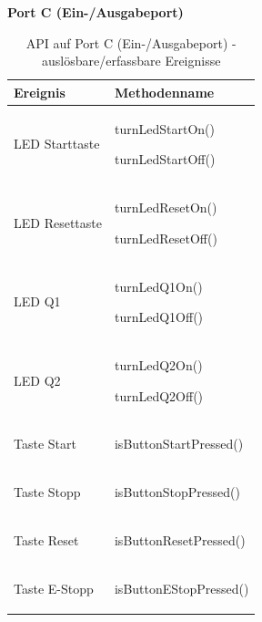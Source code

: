 \documentclass[a4paper, 11pt]{article}
\begin{document}
\newpage

\noindent\textbf{Port C (Ein-/Ausgabeport)}
\begin{table}[h]
\center
\begin{tabularx}{\textwidth}{|X|X|}
\hline
\textbf{Ereignis}&\textbf{Methodenname}\\
\hline
LED Starttaste&\begin{compactenum}[]
           \item \ttfamily turnLedStartOn()
           \item \ttfamily turnLedStartOff()
           \end{compactenum}\\
\hline
LED Resettaste&\begin{compactenum}[]
           \item \ttfamily turnLedResetOn()
           \item \ttfamily turnLedResetOff()
           \end{compactenum}\\
\hline
LED Q1&\begin{compactenum}[]
           \item \ttfamily turnLedQ1On()
           \item \ttfamily turnLedQ1Off()
           \end{compactenum}\\
\hline
LED Q2&\begin{compactenum}[]
           \item \ttfamily turnLedQ2On()
           \item \ttfamily turnLedQ2Off()
           \end{compactenum}\\
\hline
Taste Start&\begin{compactenum}[]
           \item \ttfamily isButtonStartPressed()
           \end{compactenum}\\
\hline
Taste Stopp&\begin{compactenum}[]
           \item \ttfamily isButtonStopPressed()
           \end{compactenum}\\
\hline
Taste Reset&\begin{compactenum}[]
           \item \ttfamily isButtonResetPressed()
           \end{compactenum}\\
\hline
Taste E-Stopp&\begin{compactenum}[]
           \item \ttfamily isButtonEStopPressed()
           \end{compactenum}\\
\hline
\end{tabularx}
\caption{API auf Port C (Ein-/Ausgabeport) - auslösbare/erfassbare Ereignisse}
\label{portC}
\end{table}
\end{document}
